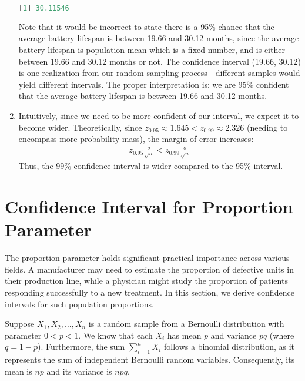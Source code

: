 \begin{solution}
\begin{enumerate}
\begin{lstlisting}[language=R]
[1] 30.11546
    \end{lstlisting}
    Note that it would be incorrect to state there is a 95\% chance that the average battery lifespan is between 19.66 and 30.12 months,
    since the average battery lifespan is population mean which is a fixed number, and is either between 19.66 and 30.12 months or not.
    The confidence interval (19.66, 30.12) is one realization from our random sampling process - different samples would yield different intervals.
    The proper interpretation is: we are 95\% confident that the average battery lifespan is between 19.66 and 30.12 months.
    \item Intuitively, since we need to be more confident of our interval, we expect it to become wider.
    Theoretically, since \( z_{0.95} \approx 1.645 < z_{0.99} \approx 2.326 \) (needing to encompass more probability mass), the margin of error increases:
    \begin{gather*}
        z_{0.95}\frac{\sigma}{\sqrt{n}} < z_{0.99}\frac{\sigma}{\sqrt{n}}
    \end{gather*}
    Thus, the 99\% confidence interval is wider compared to the 95\% interval.
    \end{enumerate}
\end{solution}

\section{Confidence Interval for Proportion Parameter}

The proportion parameter holds significant practical importance across various fields.
A manufacturer may need to estimate the proportion of defective units in their production line,
while a physician might study the proportion of patients responding successfully to a new treatment.
In this section, we derive confidence intervals for such population proportions.

Suppose \( X_1, X_2, \ldots, X_n \) is a random sample from a Bernoulli distribution with parameter \( 0 < p < 1 \).
We know that each \( X_i \) has mean \( p \) and variance \( pq \) (where \( q = 1 - p \)).
Furthermore, the sum \( \sum_{i = 1}^{n} X_i \) follows a binomial distribution, as it represents the sum of independent Bernoulli random variables.
Consequently, its mean is \( np \) and its variance is \( npq \).

